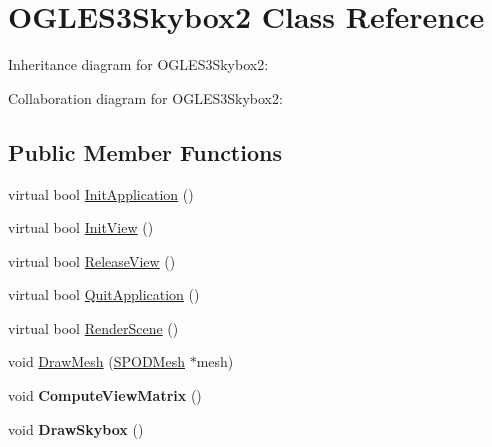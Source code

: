 \hypertarget{class_o_g_l_e_s3_skybox2}{\section{O\+G\+L\+E\+S3\+Skybox2 Class Reference}
\label{class_o_g_l_e_s3_skybox2}
}


Inheritance diagram for O\+G\+L\+E\+S3\+Skybox2\+:


Collaboration diagram for O\+G\+L\+E\+S3\+Skybox2\+:
\subsection*{Public Member Functions}
\begin{DoxyCompactItemize}
\item 
virtual bool \hyperlink{class_o_g_l_e_s3_skybox2_ab2f6c9d8935d62344c37362b05631072}{Init\+Application} ()
\item 
virtual bool \hyperlink{class_o_g_l_e_s3_skybox2_a8ffd3e8419f04229f3a96afa67b51183}{Init\+View} ()
\item 
virtual bool \hyperlink{class_o_g_l_e_s3_skybox2_a2bdba846a97b61e9e41976cbe39b66e8}{Release\+View} ()
\item 
virtual bool \hyperlink{class_o_g_l_e_s3_skybox2_a3063bc3ff1826a9546bf5116df90437a}{Quit\+Application} ()
\item 
virtual bool \hyperlink{class_o_g_l_e_s3_skybox2_a1e0c5d207ff576c3a4a6a8966a1a875b}{Render\+Scene} ()
\item 
void \hyperlink{class_o_g_l_e_s3_skybox2_a7944f5e6c3ca988fbe46f65eb5a2842d}{Draw\+Mesh} (\hyperlink{struct_s_p_o_d_mesh}{S\+P\+O\+D\+Mesh} $\ast$mesh)
\item 
\hypertarget{class_o_g_l_e_s3_skybox2_abf68ae250417cac07a65ec8d6566a81f}{void {\bfseries Compute\+View\+Matrix} ()}\label{class_o_g_l_e_s3_skybox2_abf68ae250417cac07a65ec8d6566a81f}

\item 
\hypertarget{class_o_g_l_e_s3_skybox2_a7f09fc6719049b92a64135fd3394950d}{void {\bfseries Draw\+Skybox} ()}\label{class_o_g_l_e_s3_skybox2_a7f09fc6719049b92a64135fd3394950d}


\end{DoxyCompactItemize}
